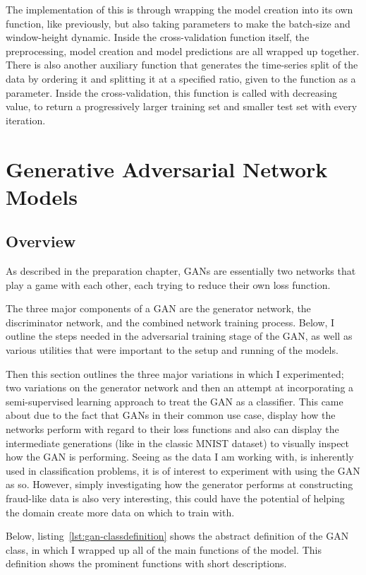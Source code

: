 \documentclass[12pt,a4paper,twoside]{report}
\begin{document}
The implementation of this is through wrapping the model creation into its own function, like previously, but also taking parameters to make the batch-size and window-height dynamic. Inside the cross-validation function itself, the preprocessing, model creation and model predictions are all wrapped up together. There is also another auxiliary function that generates the time-series split of the data by ordering it and splitting it at a specified ratio, given to the function as a parameter. Inside the cross-validation, this function is called with decreasing value, to return a progressively larger training set and smaller test set with every iteration. 

\section{Generative Adversarial Network Models}

\subsection{Overview}
As described in the preparation chapter, GANs are essentially two networks that play a game with each other, each trying to reduce their own loss function. 

The three major components of a GAN are the generator network, the discriminator network, and the combined network training process. Below, I outline the steps needed in the adversarial training stage of the GAN, as well as various utilities that were important to the setup and running of the models. 

Then this section outlines the three major variations in which I experimented; two variations on the generator network and then an attempt at incorporating a semi-supervised learning approach to treat the GAN as a classifier. This came about due to the fact that GANs in their common use case, display how the networks perform with regard to their loss functions and also can display the intermediate generations (like in the classic MNIST dataset) to visually inspect how the GAN is performing. Seeing as the data I am working with, is inherently used in classification problems, it is of interest to experiment with using the GAN as so. However, simply investigating how the generator performs at constructing fraud-like data is also very interesting, this could have the potential of helping the domain create more data on which to train with. 

Below, listing~\ref{lst:gan-classdefinition} shows the abstract definition of the GAN class, in which I wrapped up all of the main functions of the model. This definition shows the prominent functions with short descriptions. 

\end{document}

